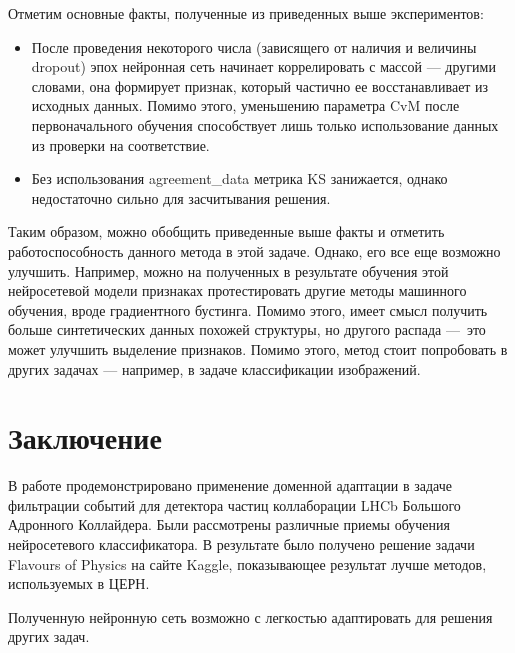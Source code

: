 \documentclass[14pt, a4paper]{extarticle}
\begin{document}
Отметим основные факты, полученные из приведенных выше экспериментов:
\begin{itemize}
	\item После проведения некоторого числа (зависящего от наличия и величины dropout) эпох нейронная сеть начинает коррелировать с массой — другими словами, она формирует признак, который частично ее восстанавливает из исходных данных. Помимо этого, уменьшению параметра CvM после первоначального обучения способствует лишь только использование данных из проверки на соответствие.
	\item Без использования agreement\_data метрика KS занижается, однако недостаточно сильно для засчитывания решения.
\end{itemize}

Таким образом, можно обобщить приведенные выше факты и отметить работоспособность данного метода в этой задаче. Однако, его все еще возможно улучшить. Например, можно на полученных в результате обучения этой нейросетевой модели признаках протестировать другие методы машинного обучения, вроде градиентного бустинга. Помимо этого, имеет смысл получить больше синтетических данных похожей структуры, но другого распада — это может улучшить выделение признаков. Помимо этого, метод стоит попробовать в других задачах — например, в задаче классификации изображений.

\newpage
\section*{Заключение}

В работе продемонстрировано применение доменной адаптации в задаче фильтрации событий для детектора частиц коллаборации LHCb Большого Адронного Коллайдера. Были рассмотрены различные приемы обучения нейросетевого классификатора. В результате было получено решение задачи Flavours of Physics на сайте Kaggle, показывающее результат лучше методов, используемых в ЦЕРН. 

Полученную нейронную сеть возможно с легкостью адаптировать для решения других задач.


\newpage
{}
\end{document}
